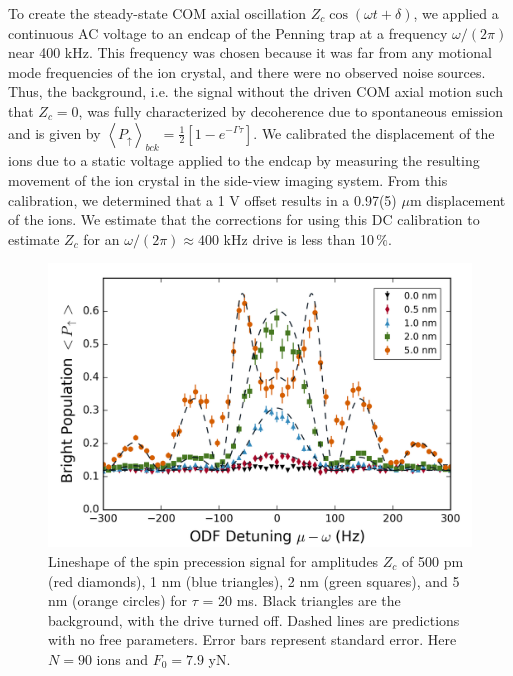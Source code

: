 \documentclass[aps,prl,twocolumn,superscriptaddress,floatfix]{revtex4-1}
\begin{document}
To create the steady-state COM axial oscillation $Z_c \cos(\omega t+\delta)$, we applied a continuous AC voltage to an endcap of the Penning trap at a frequency $\omega/(2\pi)$ near 400 kHz. This frequency was chosen because it was far from any motional mode frequencies of the ion crystal, and there were no observed noise sources. Thus, the background, i.e. the signal without the driven COM axial motion such that $Z_c =0$, was fully characterized by decoherence due to spontaneous emission and is given by $\left\langle P_{\uparrow}\right\rangle _{bck}= \frac{1}{2}\left[1-e^{-\Gamma\tau}\right]$. We calibrated the displacement of the ions due to a static voltage applied to the endcap by measuring the resulting movement of the ion crystal in the side-view imaging system. From this calibration, we determined that a 1 V offset results in a 0.97(5) $\mu$m displacement of the ions. We estimate that the corrections for using this DC calibration to estimate $Z_c$ for an $\omega/(2\pi) \approx 400$ kHz drive is less than 10$\,\%$.

\begin{figure}
    \centering
    \includegraphics[width=\columnwidth]{lineshape}
  \caption{Lineshape of the spin precession signal for amplitudes $Z_c$ of 500 pm (red diamonds), 1 nm (blue triangles), 2 nm (green squares), and 5 nm (orange circles) for $\tau$ = 20 ms. Black triangles are the background, with the drive turned off. Dashed lines are predictions with no free parameters. Error bars represent standard error. Here $N = 90$ ions and $F_{0} = 7.9$ yN.}\label{lineshape}
\end{figure}
\end{document}

